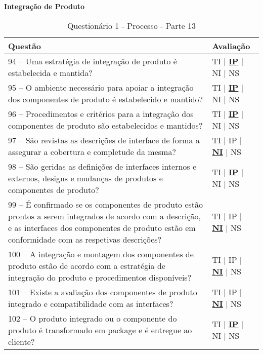 \documentclass[openany,10pt,a4paper]{article}
\begin{document}
\begin{appendix}
	\begin{table}[h]
	\textbf{Integração de Produto}
		\centering
		\caption{Questionário 1 - Processo - Parte 13}
		\begin{tabular}{p{5in}p{1in}}		
			\toprule
			\textbf{Questão}  & \textbf{Avaliação}\\ 
			\midrule
			94 – Uma estratégia de integração de produto é estabelecida e mantida?
	 & TI | \underline{\textbf{IP}} | NI | NS \\
			\midrule
			95 – O ambiente necessário para apoiar a integração dos componentes de produto é 
	estabelecido e mantido?
	 & TI | \underline{\textbf{IP}} | NI | NS \\
			\midrule
			96 – Procedimentos e critérios para a integração dos componentes de produto são estabelecidos 
	e mantidos?
	 & TI | \underline{\textbf{IP}} | NI | NS \\
			\midrule
			97 – São revistas as descrições de interface de forma a assegurar a cobertura e completude da 
	mesma?
	 & TI | IP | \underline{\textbf{NI}} | NS \\
			\midrule
			98 – São geridas as definições de interfaces internos e externos, designs e mudanças de produtos 
	e componentes de produto?
	  & TI | \underline{\textbf{IP}} | NI | NS \\
			\midrule
			99 – É confirmado se os componentes de produto estão prontos a serem integrados de acordo 
	com a descrição, e as interfaces dos componentes de produto estão em conformidade com as
	respetivas descrições? 
	 & TI | IP | \underline{\textbf{NI}} | NS \\
	 \midrule
			100 – A integração e montagem dos componentes de produto estão de acordo com a estratégia
	de integração do produto e procedimentos disponíveis? 
	 & TI | IP | \underline{\textbf{NI}} | NS \\
	 \midrule
			101 – Existe a avaliação dos componentes de produto integrado e compatibilidade com as
	interfaces? 
	 & TI | IP | \underline{\textbf{NI}} | NS \\
	 \midrule
			102 – O produto integrado ou o componente do produto é transformado em package e é
	entregue ao cliente? 
	 & TI | \underline{\textbf{IP}} | NI | NS \\
			\bottomrule
		\end{tabular} 
	\end{table}
	

\end{appendix}
\end{document}
